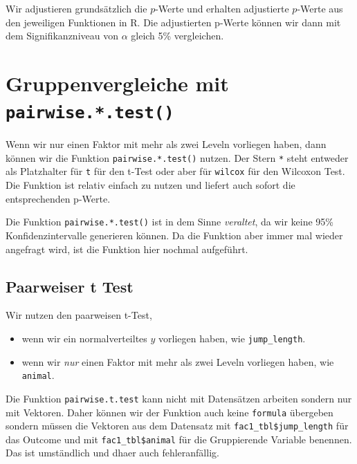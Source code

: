 \documentclass[
  letterpaper,
]{scrbook}
\providecommand{\tightlist}{%
  \setlength{\itemsep}{0pt}\setlength{\parskip}{0pt}}\usepackage{longtable,booktabs,array}
\begin{document}
Wir adjustieren grundsätzlich die \(p\)-Werte und erhalten adjustierte
\(p\)-Werte aus den jeweiligen Funktionen in R. Die adjustierten p-Werte
können wir dann mit dem Signifikanzniveau von \(\alpha\) gleich 5\%
vergleichen.

\hypertarget{sec-posthoc-pairwise}{%
\section{\texorpdfstring{Gruppenvergleiche mit
\texttt{pairwise.*.test()}}{Gruppenvergleiche mit pairwise.*.test()}}\label{sec-posthoc-pairwise}}

{}

Wenn wir nur einen Faktor mit mehr als zwei Leveln vorliegen haben, dann
können wir die Funktion \texttt{pairwise.*.test()} nutzen. Der Stern
\texttt{*} steht entweder als Platzhalter für \texttt{t} für den t-Test
oder aber für \texttt{wilcox} für den Wilcoxon Test. Die Funktion ist
relativ einfach zu nutzen und liefert auch sofort die entsprechenden
p-Werte.

Die Funktion \texttt{pairwise.*.test()} ist in dem Sinne
\emph{veraltet}, da wir keine 95\% Konfidenzintervalle generieren
können. Da die Funktion aber immer mal wieder angefragt wird, ist die
Funktion hier nochmal aufgeführt.

\hypertarget{paarweiser-t-test}{%
\subsection{Paarweiser t Test}\label{paarweiser-t-test}}

Wir nutzen den paarweisen t-Test,

\begin{itemize}
\tightlist
\item
  wenn wir ein normalverteiltes \(y\) vorliegen haben, wie
  \texttt{jump\_length}.
\item
  wenn wir \emph{nur} einen Faktor mit mehr als zwei Leveln vorliegen
  haben, wie \texttt{animal}.
\end{itemize}

Die Funktion \texttt{pairwise.t.test} kann nicht mit Datensätzen
arbeiten sondern nur mit Vektoren. Daher können wir der Funktion auch
keine \texttt{formula} übergeben sondern müssen die Vektoren aus dem
Datensatz mit \texttt{fac1\_tbl\$jump\_length} für das Outcome und mit
\texttt{fac1\_tbl\$animal} für die Gruppierende Variable benennen. Das
ist umständlich und dhaer auch fehleranfällig.
\end{document}
